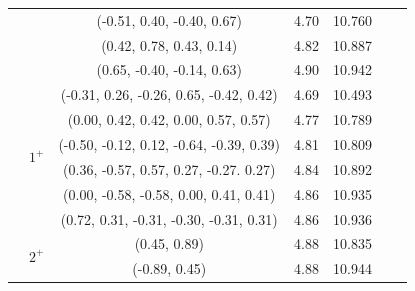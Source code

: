 \documentclass[prd,twocolumn,floatfix,nofootinbib]{revtex4}
\begin{document}
\begin{table}[!htbp]
\begin{tabular}{ccccccc}
                        &           &(-0.51, 0.40, -0.40, 0.67)                 &4.70	    &10.760 \\ 
                        &           &(0.42, 0.78, 0.43, 0.14)                   &4.82	    &10.887 \\ 
                        &           &(0.65, -0.40, -0.14, 0.63)                 &4.90	    &10.942 \\ 
                        &\multirow{6}{*}{$1^{+}$}
                                    &(-0.31, 0.26, -0.26, 0.65, -0.42, 0.42)    &4.69	    &10.493 \\ 
                        &           &(0.00, 0.42, 0.42, 0.00, 0.57, 0.57)       &4.77	    &10.789 \\ 
                        &           &(-0.50, -0.12, 0.12, -0.64, -0.39, 0.39)   &4.81	    &10.809 \\ 
                        &           &(0.36, -0.57, 0.57, 0.27, -0.27. 0.27)     &4.84	    &10.892 \\ 
                        &           &(0.00, -0.58, -0.58, 0.00, 0.41, 0.41)     &4.86	    &10.935 \\ 
                        &           &(0.72, 0.31, -0.31, -0.30, -0.31, 0.31)    &4.86	    &10.936 \\ 

                        &\multirow{2}{*}{$2^{+}$}
                                    &(0.45, 0.89)                               &4.88	    &10.835 \\ 
                        &           &(-0.89, 0.45)                              &4.88	    &10.944 \\ 
        \hline\hline
    \end{tabular}
\end{table}
\end{document}
